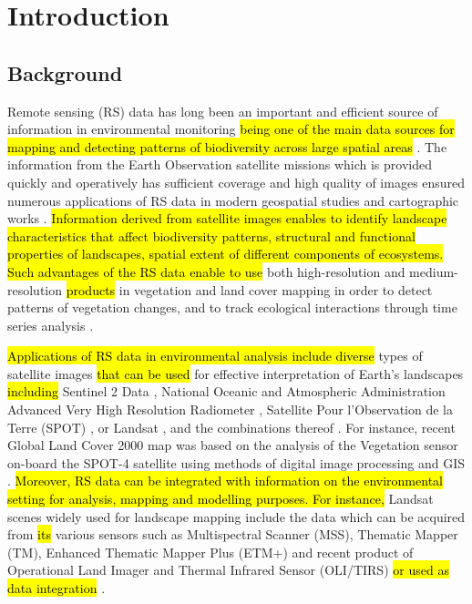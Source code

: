 \documentclass[coasts,article,submit,pdftex,moreauthors]{Definitions/mdpi}
\begin{document}
\section{Introduction}

\subsection{Background}
Remote sensing (RS) data has long been an important and efficient source of information in environmental monitoring \hl{being one of the main data sources for mapping and detecting patterns of biodiversity across large spatial areas} \cite{FAGAN2024432}. The information from the Earth Observation satellite missions which is provided quickly and operatively has sufficient coverage and high quality of images ensured numerous applications of RS data in modern geospatial studies and cartographic works \cite{LOEB2023}. \hl{Information derived from satellite images enables to identify landscape characteristics that affect biodiversity patterns, structural and functional properties of landscapes, spatial extent of different components of ecosystems. Such advantages of the RS data enable to use }both high-resolution and medium-resolution \hl{products} in vegetation and land cover mapping in order to detect patterns of vegetation changes, and to track ecological interactions through time series analysis \cite{6352393,info14040249,Lemenkova202324}. 

\hl{Applications of RS data in environmental analysis include diverse} types of satellite images \hl{that can be used }for effective interpretation of Earth's landscapes \hl{including} Sentinel 2 Data \cite{ZHAO2024169152,Lemenkova202021,CHOUDHARY20222443}, National Oceanic and Atmospheric Administration Advanced Very High Resolution Radiometer \cite{JI2017215,ZHAN2022112836}, Satellite Pour l'Observation de la Terre (SPOT) \cite{FENSHOLT20091886}, or Landsat \cite{CHEN2023e19654,Lemenkova202323,LEMESIOS2024101153,SENAY2022113011,Lemenkova202321}, and the combinations thereof \cite{XIE2023,RADELOFF2024113918}. For instance, recent Global Land Cover 2000 map was based on the analysis of the Vegetation sensor on-board the SPOT-4 satellite using methods of digital image processing and GIS \cite{GIRI2005123,WANG2023311}. \hl{Moreover, RS data can be integrated with information on the environmental setting for analysis, mapping and modelling purposes. For instance, }Landsat scenes widely used for landscape mapping include the data which can be acquired from \hl{its }various\hl{ }sensors such as Multispectral Scanner (MSS), Thematic Mapper (TM), Enhanced Thematic Mapper Plus (ETM+) and recent product of Operational Land Imager and Thermal Infrared Sensor (OLI/TIRS) \hl{or used as data integration }\cite{HE2018181,HUSSAIN2022103117,ESTOQUE2015205}.
\end{document}
